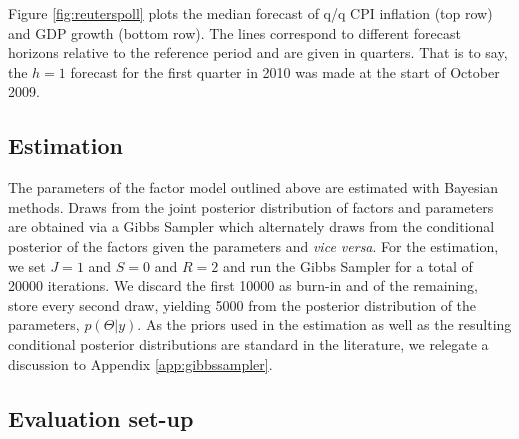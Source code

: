 \documentclass[notitlepage,a4paper,12pt]{article}
\begin{document}
Figure \ref{fig:reuterspoll} plots the median forecast of q/q CPI inflation (top row) and GDP growth (bottom row). The lines correspond to different forecast horizons relative to the reference period and are given in quarters. That is to say, the $h=1$ forecast for the first quarter in 2010 was made at the start of October 2009. 
 

\subsection{Estimation}

The parameters of the factor model outlined above are estimated with Bayesian methods. Draws from the joint posterior distribution of factors and parameters are obtained via a Gibbs Sampler which alternately draws from the conditional posterior of the factors given the parameters and \textit{vice versa}. For the estimation, we set $J=1$ and $S=0$ and $R=2$ and run the Gibbs Sampler for a total of 20000 iterations. We discard the first 10000 as burn-in and of the remaining, store every second draw, yielding 5000 from the posterior distribution of the parameters, $p(\Theta|y)$. As the priors used in the estimation as well as the resulting conditional posterior distributions are standard in the literature, we relegate a discussion to Appendix \ref{app:gibbssampler}. 

\subsection{Evaluation set-up}
\end{document}
